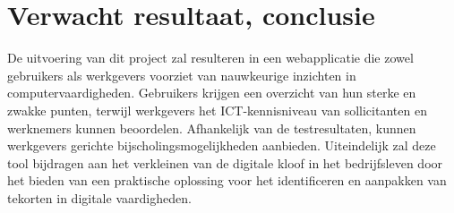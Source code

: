 

\section{Verwacht resultaat, conclusie}%
\label{sec:verwachte_resultaten}




De uitvoering van dit project zal resulteren in een webapplicatie die zowel gebruikers als werkgevers voorziet van nauwkeurige inzichten in computervaardigheden. Gebruikers krijgen een  overzicht van hun sterke en zwakke punten, terwijl werkgevers het ICT-kennisniveau van sollicitanten en werknemers kunnen beoordelen. Afhankelijk van de testresultaten, kunnen werkgevers gerichte bijscholingsmogelijkheden aanbieden. Uiteindelijk zal deze tool bijdragen aan het verkleinen van de digitale kloof in het bedrijfsleven door het bieden van een praktische oplossing voor het identificeren en aanpakken van tekorten in digitale vaardigheden.
